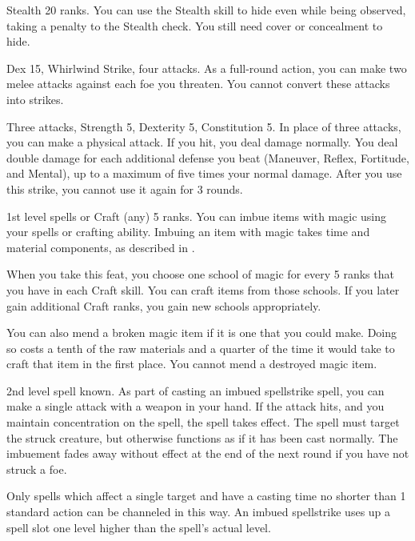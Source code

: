\featpre Stealth 20 ranks.
\featben You can use the Stealth skill to hide even while being observed, taking a  penalty to the Stealth check.
You still need cover or concealment to hide.

\featpres Dex 15, Whirlwind Strike, four attacks.
\featben As a full-round action, you can make two melee attacks against each foe you threaten. You cannot convert these attacks into strikes.

\featpre Three attacks, Strength 5, Dexterity 5, Constitution 5.
\featben In place of three attacks, you can make a physical attack.
If you hit, you deal damage normally.
You deal double damage for each additional defense you beat (Maneuver, Reflex, Fortitude, and Mental), up to a maximum of five times your normal damage.
After you use this strike, you cannot use it again for 3 rounds.

\featpre 1st level spells or Craft (any) 5 ranks.
\featben You can imbue items with magic using your spells or crafting ability.
Imbuing an item with magic takes time and material components, as described in .

When you take this feat, you choose one school of magic for every 5 ranks that you have in each Craft skill.
You can craft items from those schools.
If you later gain additional Craft ranks, you gain new schools appropriately.

You can also mend a broken magic item if it is one that you could make.
Doing so costs a tenth of the raw materials and a quarter of the time it would take to craft that item in the first place.
You cannot mend a destroyed magic item.

\featpre 2nd level spell known.
\featben As part of casting an imbued spellstrike spell, you can make a single attack with a weapon in your hand.
If the attack hits, and you maintain concentration on the spell, the spell takes effect.
The spell must target the struck creature, but otherwise functions as if it has been cast normally.
The imbuement fades away without effect at the end of the next round if you have not struck a foe.

Only spells which affect a single target and have a casting time no shorter than 1 standard action can be channeled in this way.
An imbued spellstrike uses up a spell slot one level higher than the spell's actual level.

